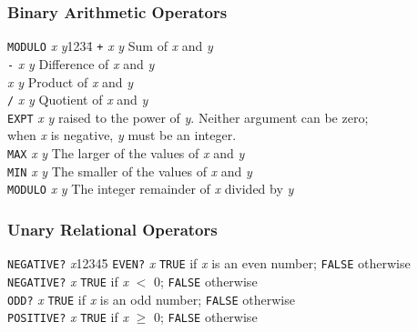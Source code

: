 \subsubsection{Binary Arithmetic Operators}
\begin{tabbing}
{\tt MODULO} {\sl x} {\sl y}1234\=\kill
{\tt +} {\sl x} {\sl y} \> Sum of {\sl x} and {\sl y}\\
{\tt -} {\sl x} {\sl y} \> Difference of {\sl x} and {\sl y}\\
{\tt *} {\sl x} {\sl y} \> Product of {\sl x} and {\sl y}\\
{\tt /} {\sl x} {\sl y} \> Quotient of {\sl x} and {\sl y}\\
{\tt EXPT} {\sl x} {\sl y}  raised to the power of {\sl y}.
		Neither argument can be zero;\\
		\> when {\sl x} is negative, {\sl y} must be an integer.\\
{\tt MAX} {\sl x} {\sl y} \> The larger of the values of {\sl x} and
{\sl y}\\
{\tt MIN} {\sl x} {\sl y} \> The smaller of the values of {\sl x} and
{\sl y}\\
{\tt MODULO} {\sl x} {\sl y} \> The integer remainder of {\sl x} divided
by {\sl y}\\
\end{tabbing}

\subsubsection{Unary Relational Operators}
\begin{tabbing}
{\tt NEGATIVE?} {\sl x}12345\=\kill
{\tt EVEN?} {\sl x} \> {\tt TRUE} if {\sl x} is an even number; {\tt FALSE}
			otherwise\\
{\tt NEGATIVE?} {\sl x} \> {\tt TRUE} if {\sl x} $<$ 0; {\tt FALSE} otherwise\\
{\tt ODD?} {\sl x} \> {\tt TRUE} if {\sl x} is an odd number; {\tt FALSE}
			otherwise\\ 
{\tt POSITIVE?} {\sl x} \> {\tt TRUE} if {\sl x} $\geq$ 0; {\tt FALSE} otherwise
\end{tabbing}

